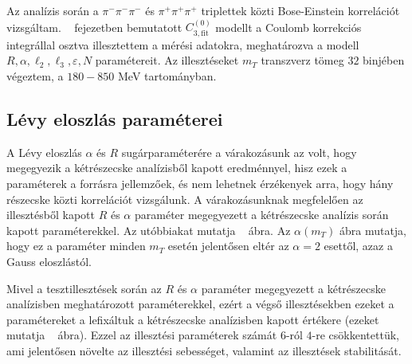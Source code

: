 \documentclass[11pt,a4paper]{article}
\numberwithin{equation}{subsection}
\numberwithin{figure}{section}
\begin{document}
Az analízis során a $\pi^-\pi^-\pi^-$ és $\pi^+\pi^+\pi^+$ triplettek közti Bose-Einstein korrelációt vizsgáltam. ~ fejezetben bemutatott $C_{3, \mathrm{fit}}^{(0)}$ modellt a Coulomb korrekciós integrállal osztva illesztettem a mérési adatokra, meghatározva a modell $R, \alpha, \ell_2, \ell_3, \varepsilon, N$ paramétereit. Az illesztéseket $m_T$ transzverz tömeg $32$ binjében végeztem, a $180-850$ MeV tartományban.

\subsection{Lévy eloszlás paraméterei}

A Lévy eloszlás $\alpha$ és $R$ sugárparaméterére a várakozásunk az volt, hogy megegyezik a kétrészecske analízisből kapott eredménnyel, hisz ezek a paraméterek a forrásra jellemzőek, és nem lehetnek érzékenyek arra, hogy hány részecske közti korrelációt vizsgálunk.  A várakozásunknak megfelelően az illesztésből kapott $R$ és $\alpha$ paraméter megegyezett a kétrészecske analízis során kapott paraméterekkel. Az utóbbiakat mutatja ~ ábra. Az $\alpha(m_T)$ ábra mutatja, hogy ez a paraméter minden $m_T$ esetén jelentősen eltér az $\alpha=2$ esettől, azaz a Gauss eloszlástól.

Mivel a tesztillesztések során az $R$ és $\alpha$ paraméter megegyezett a kétrészecske analízisben meghatározott paraméterekkel, ezért a végső illesztésekben ezeket a paramétereket a lefixáltuk a kétrészecske analízisben kapott értékere (ezeket mutatja ~ ábra). Ezzel az illesztési paraméterek számát $6$-ról $4$-re csökkentettük, ami jelentősen növelte az illesztési sebességet, valamint az illesztések stabilitását.
\end{document}

